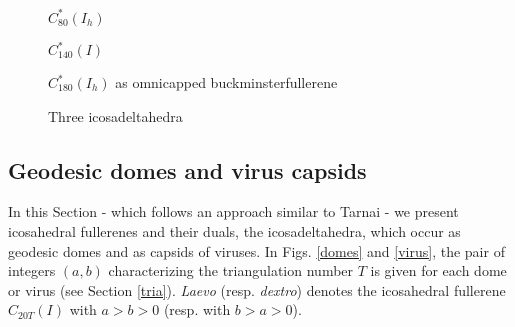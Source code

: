 \begin{figure}[htbp]
\begin{center}

$C^*_{80}(I_h)$
\end{center}
\begin{center}

$C^*_{140}(I)$
\end{center}
\begin{center}

$C^*_{180}(I_h)$ as omnicapped buckminsterfullerene

\caption{Three icosadeltahedra}
\end{center}
\end{figure}

\clearpage
\newpage
\subsection{Geodesic domes and virus capsids}\label{mamax}
In this Section - which follows an approach similar to {\sc Tarnai} \cite{tarnai} -
we present icosahedral fullerenes and their
duals, the icosadeltahedra, which occur as geodesic domes
and as capsids of viruses. In Figs. \ref{domes} and \ref{virus}, the
pair of integers $(a,b)$ characterizing the triangulation number $T$
is given for each dome or virus (see Section \ref{tria}). {\it Laevo}
(resp. {\it dextro}) denotes the icosahedral fullerene $C_{20T}(I)$
with $a>b>0$ (resp. with $b>a>0$). 


